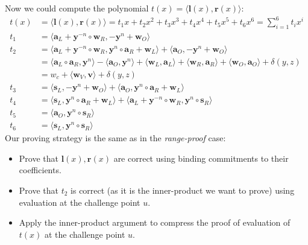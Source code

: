 \documentclass[../../book.tex]{subfiles}
\begin{document}
Now we could compute the polynomial $t(x) = \langle \mathbf{l}(x), \mathbf{r}(x) \rangle$:
\begin{equation}
    \begin{aligned}
        t(x) &= \langle \mathbf{l}(x), \mathbf{r}(x) \rangle = t_1 x + t_2 x^2 + t_3 x^3 + t_4 x^4 + t_5 x^5 + t_6 x^6 = \sum_{i=1}^{6} t_i x^i \\
        t_1 &= \langle \mathbf{a}_L + \mathbf{y}^{-n} \circ \mathbf{w}_R, - \mathbf{y}^n + \mathbf{w}_O \rangle \\
        t_2 &= \langle \mathbf{a}_L + \mathbf{y}^{-n} \circ \mathbf{w}_R, \mathbf{y}^n \circ \mathbf{a}_R + \mathbf{w}_L \rangle + \langle \mathbf{a}_O, -\mathbf{y}^n + \mathbf{w}_O \rangle  \\
        &= \langle \mathbf{a}_L \circ \mathbf{a}_R, \mathbf{y}^n \rangle - \langle \mathbf{a}_O, \mathbf{y}^n \rangle + \langle \mathbf{w}_L, \mathbf{a}_L \rangle + \langle \mathbf{w}_R, \mathbf{a}_R \rangle + \langle \mathbf{w}_O, \mathbf{a}_O \rangle + \delta(y, z) \\
        &= w_c + \langle \mathbf{w}_V, \mathbf{v} \rangle + \delta(y, z) \\
        t_3 &= \langle \mathbf{s}_L, - \mathbf{y}^n + \mathbf{w}_O \rangle + \langle \mathbf{a}_O, \mathbf{y}^n \circ \mathbf{a}_R + \mathbf{w}_L \rangle \\
        t_4 &= \langle \mathbf{s}_L, \mathbf{y}^n \circ \mathbf{a}_R +  \mathbf{w}_L \rangle + \langle \mathbf{a}_L + \mathbf{y}^{-n} \circ \mathbf{w}_R, \mathbf{y}^n \circ \mathbf{s}_R \rangle \\
        t_5 &= \langle \mathbf{a}_O, \mathbf{y}^n \circ \mathbf{s}_R \rangle \\
        t_6 &= \langle \mathbf{s}_L, \mathbf{y}^n \circ \mathbf{s}_R \rangle
    \end{aligned}
    \label{eq:inner-product-circuit-polynomials-product}
\end{equation}
Our proving strategy is the same as in the \textit{range-proof} case:
\begin{itemize}
    \item Prove that $\mathbf{l}(x), \mathbf{r}(x)$ are correct using binding commitments to their coefficients.
    \item Prove that $t_2$ is correct (as it is the inner-product we want to prove) using evaluation at the challenge point $u$.
    \item Apply the inner-product argument to compress the proof of evaluation of $t(x)$ at the challenge point $u$.
\end{itemize}
\end{document}

